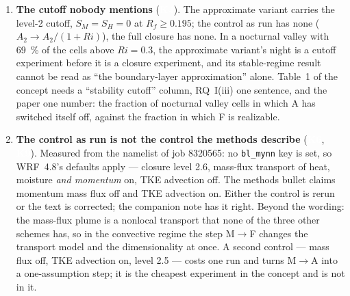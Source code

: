 \documentclass[10pt,a4paper]{article}
\newcommand{\keytag}[1]{\colorbox{keyc}{\textcolor{white}{\sffamily\bfseries\scriptsize K#1}}}
\begin{document}
\begin{enumerate}\setlength{\itemsep}{2pt}
\item \textbf{The cutoff nobody mentions} (\keytag{4}). The approximate variant carries the level-2 cutoff, $S_M = S_H = 0$ at $R_f \ge 0.195$; the control as run has none ($A_2 \to A_2/(1+Ri)$), the full closure has none. In a nocturnal valley with 69~\% of the cells above $Ri = 0.3$, the approximate variant's night is a cutoff experiment before it is a closure experiment, and its stable-regime result cannot be read as ``the boundary-layer approximation'' alone. Table~1 of the concept needs a ``stability cutoff'' column, RQ~I(iii) one sentence, and the paper one number: the fraction of nocturnal valley cells in which A has switched itself off, against the fraction in which F is realizable.

\item \textbf{The control as run is not the control the methods describe} (\keytag{6}, \keytag{9}). Measured from the namelist of job 8320565: no \texttt{bl\_mynn} key is set, so WRF~4.8's defaults apply — closure level 2.6, mass-flux transport of heat, moisture \emph{and momentum} on, TKE advection off. The methods bullet claims momentum mass flux off and TKE advection on. Either the control is rerun or the text is corrected; the companion note has it right. Beyond the wording: the mass-flux plume is a nonlocal transport that none of the three other schemes has, so in the convective regime the step M$\to$F changes the transport model and the dimensionality at once. A second control — mass flux off, TKE advection on, level 2.5 — costs one run and turns M$\to$A into a one-assumption step; it is the cheapest experiment in the concept and is not in it.


\end{enumerate}
\end{document}
